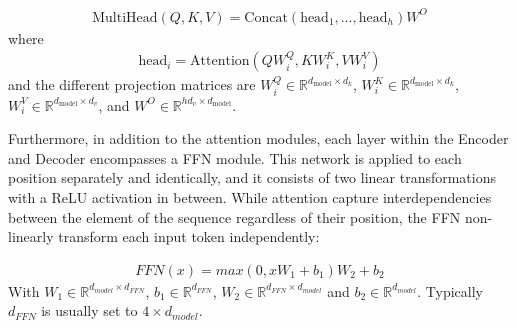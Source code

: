 \begin{align}
\text{MultiHead}(Q, K, V) = \text{Concat}(\text{head}_1, \dots, \text{head}_h)W^O
\end{align}
where
\begin{align}
\text{head}_i = \text{Attention}(QW_i^Q, KW_i^K, VW_i^V)
\end{align}
and the different projection matrices are $W_i^Q \in \mathbb{R}^{d_{\text{model}} \times d_k}$, $W_i^K \in \mathbb{R}^{d_{\text{model}} \times d_k}$, $W_i^V \in \mathbb{R}^{d_{\text{model}} \times d_v}$, and $W^O \in \mathbb{R}^{hd_{v} \times d_{\text{model}}}$.


Furthermore, in addition to the attention modules, each layer within the Encoder and Decoder encompasses a \ac{FFN} module. This network is applied to each position separately and identically, and it consists of two linear transformations with a \ac{ReLU} activation in between. While attention capture interdependencies between the element of the sequence regardless of their position, the \ac{FFN} non-linearly transform each input token independently:

\begin{align}
    FFN(x) = max(0,xW_1 + b_1)W_2 + b_2
    \label{equation:FFN}
\end{align}
With $W_1 \in \mathbb{R}^{d_{model} \times d_{FFN}}$, $b_1 \in \mathbb{R}^{d_{FFN}}$, $W_2 \in \mathbb{R}^{d_{FFN} \times d_{model}}$ and $b_2 \in \mathbb{R}^{d_{model}}$. Typically $d_{FFN}$ is usually set to $4 \times d_{model}$.

